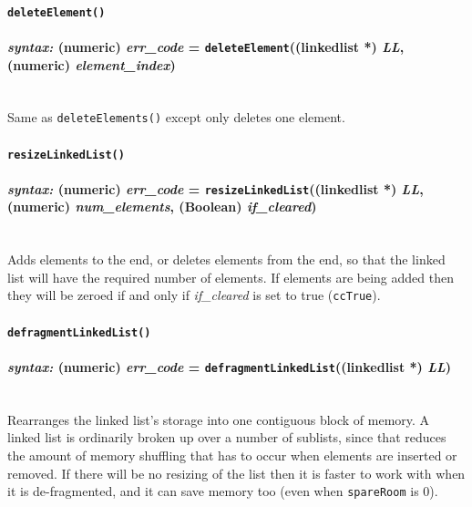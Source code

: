 \documentclass{article}
\begin{document}
\paragraph{\texttt{deleteElement()}\\\\
\normalfont \emph{syntax: } (numeric) \emph{err\_code} = \texttt{deleteElement}((linkedlist *) \emph{LL}, (numeric) \emph{element\_index})\\\\} 

Same as \verb#deleteElements()# except only deletes one element.\\



\paragraph{\texttt{resizeLinkedList()}\\\\
\normalfont \emph{syntax: } (numeric) \emph{err\_code} = \texttt{resizeLinkedList}((linkedlist *) \emph{LL}, (numeric) \emph{num\_elements}, (Boolean) \emph{if\_cleared})\\\\} 

Adds elements to the end, or deletes elements from the end, so that the linked list will have the required number of elements.  If elements are being added then they will be zeroed if and only if \emph{if\_cleared} is set to true (\verb#ccTrue#).\\




\paragraph{\texttt{defragmentLinkedList()}\\\\
\normalfont \emph{syntax: } (numeric) \emph{err\_code} = \texttt{defragmentLinkedList}((linkedlist *) \emph{LL})\\\\}

Rearranges the linked list's storage into one contiguous block of memory.  A linked list is ordinarily broken up over a number of sublists, since that reduces the amount of memory shuffling that has to occur when elements are inserted or removed.  If there will be no resizing of the list then it is faster to work with when it is de-fragmented, and it can save memory too (even when \texttt{spareRoom} is 0).
\end{document}
